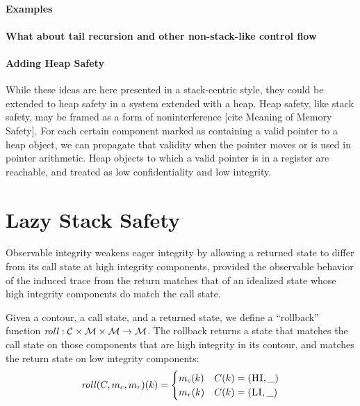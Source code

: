 \documentclass[acmsmall,review,anonymous]{acmart}\settopmatter{printfolios=true,printccs=false,printacmref=false}
\begin{document}
  \paragraph{Examples}


  \paragraph{What about tail recursion and other non-stack-like control flow}


  \paragraph{Adding Heap Safety}

    While these ideas are here presented in a stack-centric style, they could
    be extended to heap safety in a system extended with a heap. Heap safety,
    like stack safety, may be framed as a form of noninterference
    [cite Meaning of Memory Safety]. For each certain component marked as
    containing a valid pointer to a heap object, we can propagate that
    validity when the pointer moves or is used in pointer arithmetic. Heap
    objects to which a valid pointer is in a register are reachable, and
    treated as low confidentiality and low integrity.

\section{Lazy Stack Safety}
\label{sec:lazy}

      Observable integrity weakens eager integrity by allowing a returned state
      to differ from its call state at high integrity components, provided the
      observable behavior of the induced trace from the return matches that of
      an idealized state whose high integrity components do match the call
      state.

      Given a contour, a call state, and a returned state, we define a
      ``rollback'' function \(\mathit{roll} : {\mathcal C} \times {\mathcal M} \times
      {\mathcal M} \rightarrow {\mathcal M}\). The rollback returns a state that matches
      the call state on those components that are high integrity in its
      contour, and matches the return state on low integrity components:
      \[\mathit{roll}(C,m_c,m_r)(k) =
      \begin{cases}
        m_c(k) & C(k) = (\textsc{HI},\_) \\
        m_r(k) & C(k) = (\textsc{LI},\_) \\
      \end{cases}\]
\end{document}
